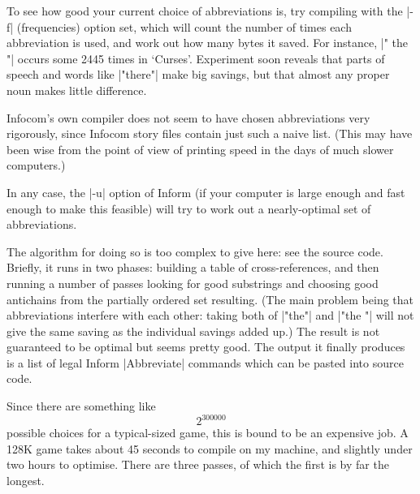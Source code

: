 To see how good your current choice of abbreviations is, try compiling with
the |-f| (frequencies) option set, which will count the number of times each
abbreviation is used, and work out how many bytes it saved.  For instance,
|" the "| occurs some 2445 times in `Curses'.  Experiment soon reveals that
parts of speech and words like |"there"| make big savings, but that almost
any proper noun makes little difference.

Infocom's own compiler does not seem to have chosen abbreviations very
rigorously, since Infocom story files contain just such a naive list.  (This
may have been wise from the point of view of printing speed in the days of
much slower computers.)

In any case, the |-u| option of Inform (if your computer is large enough and
fast enough to make this feasible) will try to work out a nearly-optimal set
of abbreviations.

The algorithm for doing so is too complex to give here: see the source code.
Briefly, it runs in two phases: building a table of cross-references, and
then running a number of passes looking for good substrings and choosing
good antichains from the partially ordered set resulting.  (The main problem
being that abbreviations interfere with each other: taking both of
|"the"| and |"the "| will not give the same saving as the individual savings
added up.)  The result is not guaranteed to be optimal but seems pretty good.
The output it finally produces is a list of legal Inform |Abbreviate|
commands which can be pasted into source code.

Since there are something like
$$ 2^{300000} $$
possible choices for a typical-sized game, this is bound to be an
expensive job.  A 128K game takes about 45 seconds to compile on my machine,
and slightly under two hours to optimise.  There are three passes, of which
the first is by far the longest.

